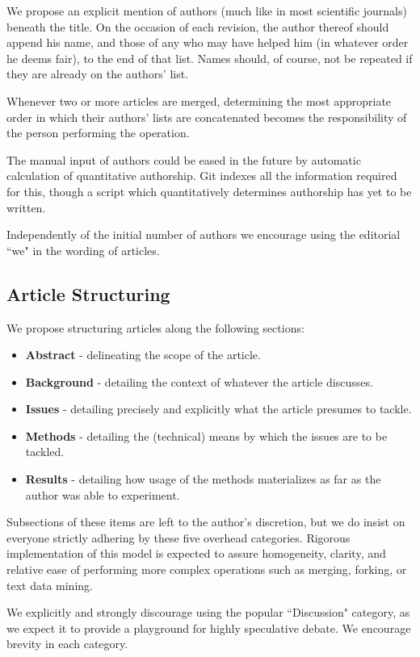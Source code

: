 We propose an explicit mention of authors (much like in most scientific journals) beneath the title.
On the occasion of each revision, the author thereof should append his name, and those of any who may have helped him (in whatever order he deems fair), to the end of that list.
Names should, of course, not be repeated if they are already on the authors' list.

Whenever two or more articles are merged, determining the most appropriate order in which their authors' lists are concatenated becomes the responsibility of the person performing the operation. 

The manual input of authors could be eased in the future by automatic calculation of quantitative authorship.
Git indexes all the information required for this, though a script which quantitatively determines authorship has yet to be written.

Independently of the initial number of authors we encourage using the editorial ``we" in the wording of articles.
\subsection{Article Structuring}
We propose structuring articles along the following sections:
\begin{itemize}
	\item\textbf{Abstract} - delineating the scope of the article.
	\item\textbf{Background} - detailing the context of whatever the article discusses.
	\item\textbf{Issues} - detailing precisely and explicitly what the article presumes to tackle.
	\item\textbf{Methods} - detailing the (technical) means by which the issues are to be tackled.
	\item\textbf{Results} - detailing how usage of the methods materializes as far as the author was able to experiment.
\end{itemize}
Subsections of these items are left to the author's discretion, but we do insist on everyone strictly adhering by these five overhead categories.
Rigorous implementation of this model is expected to assure homogeneity, clarity, and relative ease of performing more complex operations such as merging, forking, or text data mining.

We explicitly and strongly discourage using the popular ``Discussion" category, as we expect it to provide a playground for highly speculative debate. 
We encourage brevity in each category.

